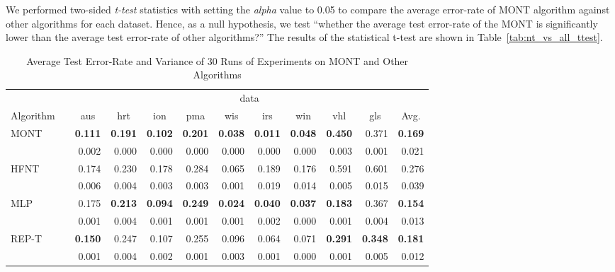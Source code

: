 \documentclass[conference]{IEEEtran}
\begin{document}
We performed two-sided \textit{t-test} statistics with setting the \textit{alpha} value to 0.05 to compare the average error-rate of MONT algorithm against other algorithms for each dataset. Hence, as a null hypothesis, we test ``whether the average test error-rate of the MONT is significantly lower than the average test error-rate of other algorithms?'' The results of the statistical t-test are shown in Table~\ref{tab:nt_vs_all_ttest}.  
\begin{table*}
    \begin{center}
        \renewcommand{\arraystretch}{1}
        \setlength{\tabcolsep}{10pt}
        {\caption{Average Test Error-Rate  and Variance  of 30 Runs of Experiments on MONT and Other Algorithms}
            \label{tab:nt_vs_all}}
        \begin{tabular}{lrrrrrrrrrrr}
            \hline
            & & \multicolumn{10}{c}{data} \\
            \cline{3-11}
            Algorithm &  \multicolumn{1}{c}{} & 
            \multicolumn{1}{c}{aus}   & \multicolumn{1}{c}{hrt}  &  \multicolumn{1}{c}{ion}   & \multicolumn{1}{c}{pma}  &  \multicolumn{1}{c}{wis}   & \multicolumn{1}{c}{irs}  & \multicolumn{1}{c}{win}   & \multicolumn{1}{c}{vhl}  & \multicolumn{1}{c}{gls}   & \multicolumn{1}{c}{Avg.} \\
            \hline
            MONT &  & \textbf{0.111} & \textbf{0.191} & \textbf{0.102} & \textbf{0.201} & \textbf{0.038} & \textbf{0.011} & \textbf{0.048} & \textbf{0.450} & 0.371 & \textbf{0.169} \\
            &  & 0.002 & 0.000 & 0.000 & 0.000 & 0.000 & 0.000 & 0.000 & 0.003 & 0.001 & 0.021 \\
HFNT &  & 0.174 & 0.230 & 0.178 & 0.284 & 0.065 & 0.189 & 0.176 & 0.591 & 0.601 & 0.276 \\
            &  & 0.006 & 0.004 & 0.003 & 0.003 & 0.001 & 0.019 & 0.014 & 0.005 & 0.015 & 0.039 \\
            MLP &  & 0.175 & \textbf{0.213} & \textbf{0.094} & \textbf{0.249} & \textbf{0.024} & \textbf{0.040} & \textbf{0.037} & \textbf{0.183} & 0.367 & \textbf{0.154} \\
            &  & 0.001 & 0.004 & 0.001 & 0.001 & 0.001 & 0.002 & 0.000 & 0.001 & 0.004 & 0.013 \\
            REP-T &  & \textbf{0.150} & 0.247 & 0.107 & 0.255 & 0.096 & 0.064 & 0.071 & \textbf{0.291} & \textbf{0.348} & \textbf{0.181} \\
            &  & 0.001 & 0.004 & 0.002 & 0.001 & 0.003 & 0.001 & 0.000 & 0.001 & 0.005 & 0.012 \\

\end{tabular}
\end{center}
\end{table*}
\end{document}
